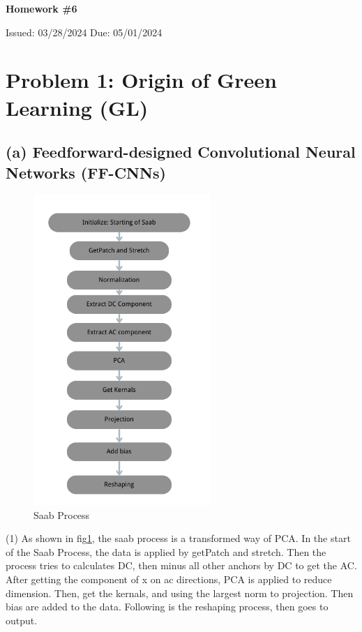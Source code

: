 \documentclass[12pt]{article}
\begin{document}
	
	\begin{center}
		\Large
		\textbf{Homework \#6}
		
		\vspace{0.2cm}
		\normalsize
		Issued: 03/28/2024 \hfill Due: 05/01/2024
	\end{center}
\section*{Problem 1: Origin of Green Learning (GL)}
\subsection*{(a) Feedforward-designed Convolutional Neural Networks (FF-CNNs)}
	\begin{figure}[H]
		\centering
		\includegraphics[width=0.6\textwidth]{saab.png}
	\caption{Saab Process}
	\label{p1a}
\end{figure}
	(1) As shown in fig\ref{p1a}, the saab process is a transformed way of PCA. In the start of the Saab Process, the data is applied by getPatch and stretch. Then the process tries to calculates DC, then minus all other anchors by DC to get the AC. After getting the component of x on ac directions, PCA is applied to reduce dimension. Then, get the kernals, and using the largest norm to projection. Then bias are added to the data. Following is the reshaping process, then goes to output. 
\end{document}
